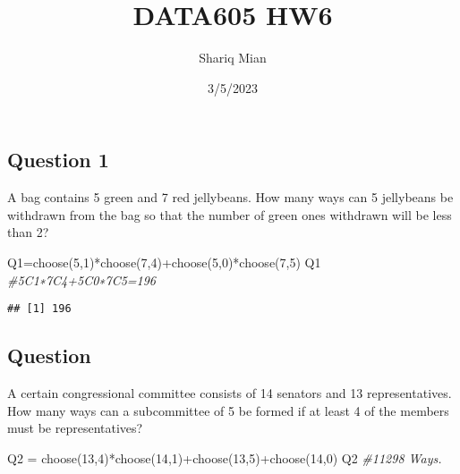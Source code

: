 \documentclass[
]{article}
\title{DATA605 HW6}
\author{Shariq Mian}
\date{3/5/2023}
\newenvironment{Shaded}{\begin{snugshade}}{\end{snugshade}}
\newcommand{\CommentTok}[1]{\textcolor[rgb]{0.56,0.35,0.01}{\textit{#1}}}
\newcommand{\DecValTok}[1]{\textcolor[rgb]{0.00,0.00,0.81}{#1}}
\newcommand{\FunctionTok}[1]{\textcolor[rgb]{0.00,0.00,0.00}{#1}}
\newcommand{\NormalTok}[1]{#1}
\newcommand{\OtherTok}[1]{\textcolor[rgb]{0.56,0.35,0.01}{#1}}
\newcommand{\SpecialCharTok}[1]{\textcolor[rgb]{0.00,0.00,0.00}{#1}}
\begin{document}
\maketitle

\hypertarget{question-1}{%
\subsection{Question 1}\label{question-1}}

A bag contains 5 green and 7 red jellybeans. How many ways can 5
jellybeans be withdrawn from the bag so that the number of green ones
withdrawn will be less than 2?

\begin{Shaded}
\begin{Highlighting}[]
\NormalTok{Q1}\OtherTok{=}\FunctionTok{choose}\NormalTok{(}\DecValTok{5}\NormalTok{,}\DecValTok{1}\NormalTok{)}\SpecialCharTok{*}\FunctionTok{choose}\NormalTok{(}\DecValTok{7}\NormalTok{,}\DecValTok{4}\NormalTok{)}\SpecialCharTok{+}\FunctionTok{choose}\NormalTok{(}\DecValTok{5}\NormalTok{,}\DecValTok{0}\NormalTok{)}\SpecialCharTok{*}\FunctionTok{choose}\NormalTok{(}\DecValTok{7}\NormalTok{,}\DecValTok{5}\NormalTok{)}
\NormalTok{Q1 }\CommentTok{\#5C1∗7C4+5C0∗7C5=196}
\end{Highlighting}
\end{Shaded}

\begin{verbatim}
## [1] 196
\end{verbatim}

\hypertarget{question}{%
\subsection{Question}\label{question}}

A certain congressional committee consists of 14 senators and 13
representatives. How many ways can a subcommittee of 5 be formed if at
least 4 of the members must be representatives?

\begin{Shaded}
\begin{Highlighting}[]
\NormalTok{Q2 }\OtherTok{=} \FunctionTok{choose}\NormalTok{(}\DecValTok{13}\NormalTok{,}\DecValTok{4}\NormalTok{)}\SpecialCharTok{*}\FunctionTok{choose}\NormalTok{(}\DecValTok{14}\NormalTok{,}\DecValTok{1}\NormalTok{)}\SpecialCharTok{+}\FunctionTok{choose}\NormalTok{(}\DecValTok{13}\NormalTok{,}\DecValTok{5}\NormalTok{)}\SpecialCharTok{+}\FunctionTok{choose}\NormalTok{(}\DecValTok{14}\NormalTok{,}\DecValTok{0}\NormalTok{)}
\NormalTok{Q2 }\CommentTok{\#11298 Ways.}
\end{Highlighting}
\end{Shaded}
\end{document}

